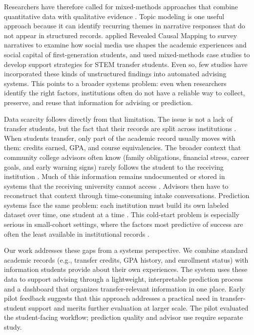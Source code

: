 \documentclass[letterpaper,11pt]{article}
\newcommand{\DIFadd}[1]{%
  \begingroup\setlength{\fboxsep}{0.5pt}%
  \colorbox{diffaddbg}{\textcolor{diffaddtext}{#1}}%
  \endgroup}
\begin{document}
Researchers have therefore called for mixed-methods approaches that combine quantitative data with qualitative evidence \parencite{nguyen2025school}. Topic modeling is one useful approach because it can identify recurring themes in narrative responses that do not appear in structured records. \textcite{deng2021} applied Revealed Causal Mapping to survey narratives to examine how social media use shapes the academic experiences and social capital of first-generation students, and \textcite{thiry2023} used mixed-methods case studies to develop support strategies for STEM transfer students. Even so, few studies have incorporated these kinds of unstructured findings into automated advising systems. This points to a broader systems problem: even when researchers identify the right factors, institutions often do not have a reliable way to collect, preserve, and reuse that information for advising or prediction.

Data scarcity follows directly from that limitation. The issue is not a lack of transfer students, but the fact that their records are split across institutions \parencite{roksa2008credits}. When students transfer, only part of the academic record usually moves with them: credits earned, GPA, and course equivalencies. The broader context that community college advisors often know (family obligations, financial stress, career goals, and early warning signs) rarely follows the student to the receiving institution \parencite{nguyen2024community}. Much of this information remains undocumented or stored in systems that the receiving university cannot access \parencite{preposttransfer2014}. Advisors then have to reconstruct that context through time-consuming intake conversations. Prediction systems face the same problem: each institution must build its own labeled dataset over time, one student at a time \parencite{coleman2019coldstart}. This cold-start problem is especially serious in small-cohort settings, where the factors most predictive of success are often the least available in institutional records \parencite{coleman2019coldstart}.

Our work addresses these gaps from a systems perspective. We combine standard academic records (e.g., transfer credits, GPA history, and enrollment status) with information students provide about their own experiences. The system uses these data to support advising through a lightweight, interpretable prediction process and a dashboard that organizes transfer-relevant information in one place. Early pilot feedback suggests that this approach addresses a practical need in transfer-student support and merits further evaluation at larger scale. \DIFadd{The} \DIFadd{pilot} \DIFadd{evaluated} \DIFadd{the} \DIFadd{student-facing} \DIFadd{workflow;} \DIFadd{prediction} \DIFadd{quality} \DIFadd{and} \DIFadd{advisor} \DIFadd{use} \DIFadd{require} \DIFadd{separate} \DIFadd{study.}
\end{document}
